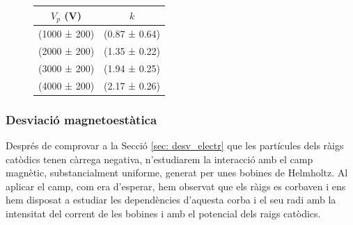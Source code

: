\documentclass[11pt]{article}
\numberwithin{equation}{section}
\numberwithin{figure}{section}
\numberwithin{table}{section}
\begin{document}
\begin{figure}[h]
    \centering
    \begin{minipage}{0.45\textwidth} 
        \centering
        \begin{tabular}{|c|c|}
            \hline
            $V_p$ (V)	&	$k$	\\\hline
            (1000 ± 200)	&	(0.87 ± 0.64)   \\\hline
            (2000 ± 200)	&	(1.35 ± 0.22)	\\\hline
            (3000 ± 200)	&	(1.94 ± 0.25)	\\\hline
            (4000 ± 200)	&	(2.17 ± 0.26)	\\\hline           
        \end{tabular}
        \label{tab:kvsVp}
    \end{minipage}
\end{figure}


\subsubsection{Desviació magnetoestàtica}\label{sec: desv_magn}
Després de comprovar a la Secció \ref{sec: desv_electr} que les partícules dels ràigs catòdics tenen càrrega negativa, n'estudiarem la interacció amb el camp magnètic, substancialment uniforme, generat per unes bobines de Helmholtz. 
Al aplicar el camp, com era d'esperar, hem observat que els ràigs es corbaven i ens hem disposat a estudiar les dependències d'aquesta corba i el seu radi amb la intensitat del corrent de les bobines i amb el potencial dels raigs catòdics.
\end{document}
